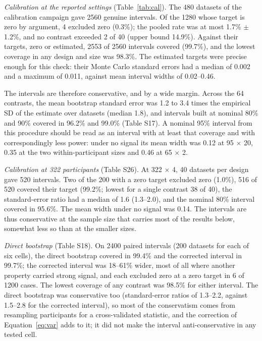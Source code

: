\emph{Calibration at the reported settings} (Table~\ref{tab:cal}). The 480 datasets of the calibration campaign gave 2560 genuine intervals. Of the 1280 whose target is zero by argument, 4 excluded zero (0.3\%); the pooled rate was at most 1.7\% $\pm$ 1.2\%, and no contrast exceeded 2 of 40 (upper bound 14.9\%). Against their targets, zero or estimated, 2553 of 2560 intervals covered (99.7\%), and the lowest coverage in any design and size was 98.3\%. The estimated targets were precise enough for this check: their Monte Carlo standard errors had a median of 0.002 and a maximum of 0.011, against mean interval widths of 0.02--0.46.

The intervals are therefore conservative, and by a wide margin. Across the 64 contrasts, the mean bootstrap standard error was 1.2 to 3.4 times the empirical SD of the estimate over datasets (median 1.8), and intervals built at nominal 80\% and 90\% covered in 96.2\% and 99.0\% (Table S17). A nominal 95\% interval from this procedure should be read as an interval with at least that coverage and with correspondingly less power: under no signal its mean width was 0.12 at 95 $\times$ 20, 0.35 at the two within-participant sizes and 0.46 at 65 $\times$ 2.

\emph{Calibration at 322 participants} (Table S26). At 322 $\times$ 4, 40 datasets per design gave 520 intervals. Two of the 200 with a zero target excluded zero (1.0\%), 516 of 520 covered their target (99.2\%; lowest for a single contrast 38 of 40), the standard-error ratio had a median of 1.6 (1.3--2.0), and the nominal 80\% interval covered in 95.6\%. The mean width under no signal was 0.14. The intervals are thus conservative at the sample size that carries most of the results below, somewhat less so than at the smaller sizes.

\emph{Direct bootstrap} (Table S18). On 2400 paired intervals (200 datasets for each of six cells), the direct bootstrap covered in 99.4\% and the corrected interval in 99.7\%; the corrected interval was 18--61\% wider, most of all where another property carried strong signal, and each excluded zero at a zero target in 6 of 1200 cases. The lowest coverage of any contrast was 98.5\% for either interval. The direct bootstrap was conservative too (standard-error ratios of 1.3--2.2, against 1.5--2.8 for the corrected interval), so most of the conservatism comes from resampling participants for a cross-validated statistic, and the correction of Equation~\ref{eq:var} adds to it; it did not make the interval anti-conservative in any tested cell.

